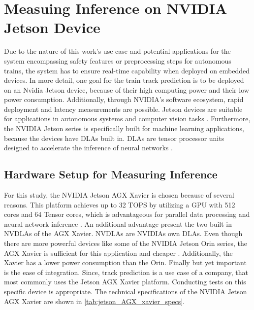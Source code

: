 \section{Measuing Inference on NVIDIA Jetson Device}
\label{sec:measuringInference}

Due to the nature of this work's use case and potential applications for the system encompassing safety features or preprocessing steps for autonomous trains, the system has to ensure real-time capability when deployed on embedded devices. 
In more detail, one goal for the train track prediction is to be deployed on an Nvidia Jetson device, because of their high computing power and their low power consumption.
Additionally, through NVIDIA's software ecosystem, rapid deployment and latency measurements are possible.
Jetson devices are suitable for applications in autonomous systems and computer vision tasks \cite{nvidia_jetson_embedded_devices}.
Furthermore, the NVIDIA Jetson series is specifically built for machine learning applications, because the devices have \ac{DLA}s built in.
\ac{DLA}s are tensor processor units designed to accelerate the inference of neural networks \cite{nvidia_dlas}.

\subsection{Hardware Setup for Measuring Inference}

For this study, the NVIDIA Jetson AGX Xavier is chosen because of several reasons.
This platform achieves up to 32 TOPS by utilizing a \ac{GPU} with 512 cores and 64 Tensor cores, which is advantageous for parallel data processing and neural network inference \cite{nvidia_jetson_agx_xavier_datasheet}.
An additional advantage present the two built-in \ac{NVDLA}s of the AGX Xavier.
\ac{NVDLA}s are NVIDIAs own \ac{DLA}s.
Even though there are more powerful devices like some of the NVIDIA Jetson Orin series, the AGX Xavier is sufficient for this application and cheaper \cite{nvidia_jetson_embedded_devices_prices}.
Additionally, the Xavier has a lower power consumption than the Orin.
Finally but yet important is the ease of integration.
Since, track prediction is a use case of a company, that most commonly uses the Jetson AGX Xavier platform.
Conducting tests on this specific device is appropriate.
The technical specifications of the NVIDIA Jetson AGX Xavier are shown in \autoref{tab:jetson_AGX_xavier_specs}.

